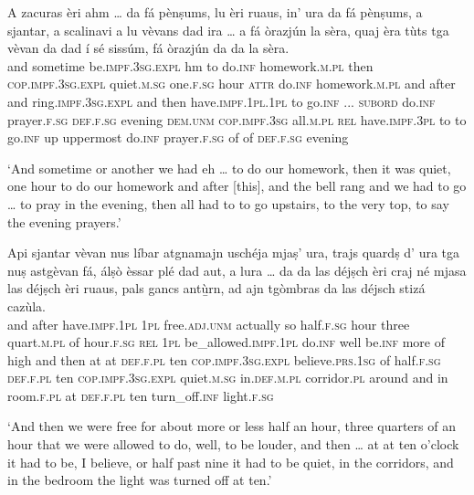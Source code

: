 \begin{linenumbers}
\gll A zacuras èri ahm …  da fá pènṣums, lu èri ruaus, in’ ura da  fá  pènṣums, a  sjantar, a scalinavi a  lu vèvans  dad ira  …  a  fá  òrazjún la sèra, quaj èra tùts tga vèvan da dad í sé sissúm, fá  òrazjún   da da la sèra.\\
 and sometime be.\textsc{impf.3sg.expl} hm {} to do.\textsc{inf} homework.\textsc{m.pl} then \textsc{cop.impf.3sg.expl} quiet.\textsc{m.sg} one.\textsc{f.sg} hour \textsc{attr} do.\textsc{inf} homework.\textsc{m.pl} and after and   ring.\textsc{impf.3sg.expl} and then have.\textsc{impf.1pl.1pl} to go.\textsc{inf} ... \textsc{subord} do.\textsc{inf} prayer.\textsc{f.sg} \textsc{def.f.sg} evening \textsc{dem.unm} \textsc{cop.impf.3sg} all.\textsc{m.pl} \textsc{rel} have.\textsc{impf.3pl} to to go.\textsc{inf} up uppermost do.\textsc{inf} prayer.\textsc{f.sg} of of \textsc{def.f.sg} evening \\
\end{linenumbers}
\medskip
\glt `And sometime or another we had eh … to do our homework, then it was quiet, one hour to do our homework and after [this], and the bell rang and we had to go … to pray in the evening, then all had to to go upstairs, to the very top, to say the evening prayers.'
\medskip

\begin{linenumbers}
\gll    Api sjantar vèvan nus líbar atgnamajn uschéja mjaṣ’ ura, trajs quardṣ d’ ura tga nuṣ astgèvan fá, álṣò èssar plé dad aut, a lura … da da las déjṣch èri craj né mjasa las déjṣch èri ruaus, pals gancs antù̱rn, ad ajn tgòmbras da las déjsch stizá cazùla.\\
and after have.\textsc{impf.1pl} \textsc{1pl} free.\textsc{adj.unm} actually so half.\textsc{f.sg} hour three quart.\textsc{m.pl} of hour.\textsc{f.sg} \textsc{rel} \textsc{1pl} be\_allowed.\textsc{impf.1pl} do.\textsc{inf} well be.\textsc{inf} more of high and then {} at at \textsc{def.f.pl} ten \textsc{cop.impf.3sg.expl} believe.\textsc{prs.1sg} of  half.\textsc{f.sg} \textsc{def.f.pl} ten \textsc{cop.impf.3sg.expl} quiet.\textsc{m.sg} in.\textsc{def.m.pl} corridor.\textsc{pl} around and in room.\textsc{f.pl} at \textsc{def.f.pl} ten turn\_off.\textsc{inf} light.\textsc{f.sg}\\
\end{linenumbers}
\medskip
\glt `And then we were free for about more or less half an hour, three quarters of an hour that we were allowed to do, well, to be louder, and then … at at ten o’clock it had to be, I believe, or half past nine it had to be quiet, in the corridors, and in the bedroom the light was turned off at ten.'
\medskip

